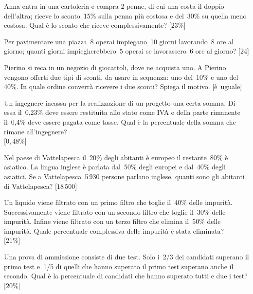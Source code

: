 \begin{multicols}{2}
\begin{esercizio}
Anna entra in una cartoleria e compra 2 penne, di cui una costa il
doppio dell'altra; riceve lo sconto~15\% sulla penna
più costosa e del~30\% su quella meno costosa. Qual è lo sconto che
riceve complessivamente?
\hfill [\(23\%\)]
\end{esercizio}

\begin{esercizio}
Per pavimentare una piazza~8 operai impiegano~10 giorni
lavorando~8 ore al giorno; quanti giorni impiegherebbero~5 operai se
lavorassero~6 ore al giorno?
\hfill [\(24\)]
\end{esercizio}

\begin{esercizio}
Pierino si reca in un negozio di giocattoli, dove ne acquista uno. A
Pierino vengono offerti due tipi di sconti, da usare in sequenza: uno 
del~10\% e uno del 40\%. 
In quale ordine converrà ricevere i due sconti? Spiega il motivo.
\hfill [è~uguale]
\end{esercizio}

\begin{esercizio}
Un ingegnere incassa per la realizzazione di un progetto una
certa somma. Di essa il~0,23\% deve essere restituita allo stato come IVA
e della parte rimanente il~0,4\% deve essere pagata come tasse.
Qual è la percentuale della somma che rimane all'ingegnere?\\
\phantom{.}\hfill [\(0,48\%\)]
\end{esercizio}

\begin{esercizio}
Nel paese di Vattelapesca il~20\% degli abitanti è europeo il
restante~80\% è asiatico. La lingua inglese è parlata dal~50\% degli
europei e dal~40\% degli asiatici. Se a Vattelapesca~5\,930 persone
parlano inglese, quanti sono gli abitanti di Vattelapesca?
\hfill [\(18\,500\)]
\end{esercizio}

\begin{esercizio}
Un liquido viene filtrato con un primo filtro che toglie il~40\%
delle impurità. Successivamente viene filtrato con un secondo filtro
che toglie il~30\% delle impurità. Infine viene filtrato con un terzo
filtro che elimina il~50\% delle impurità. Quale percentuale
complessiva delle impurità è stata eliminata?\\
\phantom{.}\hfill [\(21\%\)]
\end{esercizio}

\begin{esercizio}
Una prova di ammissione consiste di due test. Solo i~2/3 dei
candidati superano il primo test e~1/5 di quelli che hanno superato il
primo test superano anche il secondo. Qual è la percentuale di
candidati che hanno superato tutti e due i test?
\hfill [\(20\%\)]
\end{esercizio}


\end{multicols}
